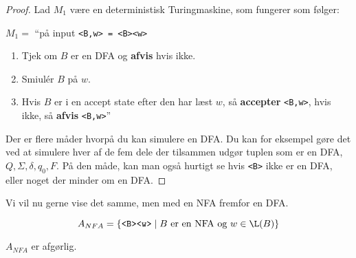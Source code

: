 \begin{proof}
	Lad $M_{1}$ være en deterministisk Turingmaskine, som fungerer som følger:

	$M_{1} = $ ``på input \texttt{<B,w> = <B><w>}
	\begin{enumerate}
		\item Tjek om $B$ er en DFA og \textbf{afvis} hvis ikke.
		\item Smiulér $B$ på $w$.
		\item Hvis $B$ er i en accept state efter den har læst $w$, så \textbf{accepter} \texttt{<B,w>}, hvis ikke, så \textbf{afvis} \texttt{<B,w>}''
	\end{enumerate}

	Der er flere måder hvorpå du kan simulere en DFA. Du kan for eksempel gøre det ved at simulere hver af de fem dele der tilsammen udgør tuplen som er en DFA, $Q, \Sigma, \delta, q_{0}, F$. På den måde, kan man også hurtigt se hvis \texttt{<B>} ikke er en DFA, eller noget der minder om en DFA.
\end{proof}

Vi vil nu gerne vise det samme, men med en NFA fremfor en DFA.

\begin{equation*}
	A_{NFA} = \{\text{\texttt{<B><w>}} \mid B \text{ er en NFA og }w \in \L(B)\}
\end{equation*}

\begin{theorem}
	$A_{NFA}$ er afgørlig.
\end{theorem}

